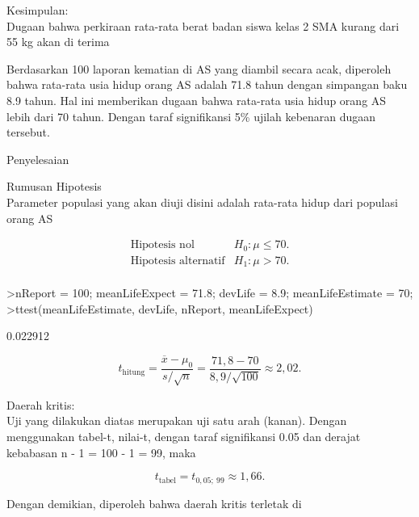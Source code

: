 \documentclass[a4paper,10pt]{article}
\begin{document}
\begin{eulernotebook}
\begin{eulercomment}
\begin{eulercomment}
\begin{eulercomment}
\begin{eulercomment}
\begin{eulercomment}
\begin{eulercomment}
\begin{eulercomment}
Kesimpulan:\\
Dugaan bahwa perkiraan rata-rata berat badan siswa kelas 2 SMA kurang
dari 55 kg akan di terima
\end{eulercomment}
\begin{eulercomment}
Berdasarkan 100 laporan kematian di AS yang diambil secara acak,
diperoleh bahwa rata-rata usia hidup orang AS adalah 71.8 tahun dengan
simpangan baku 8.9 tahun. Hal ini memberikan dugaan bahwa rata-rata
usia hidup orang AS lebih dari 70 tahun. Dengan taraf signifikansi 5\%
ujilah kebenaran dugaan tersebut.

Penyelesaian

Rumusan Hipotesis\\
Parameter populasi yang akan diuji  disini adalah rata-rata hidup dari
populasi orang AS

\end{eulercomment}
\begin{eulerformula}
\[
\begin{array}{cc} \text{Hipotesis nol} & H_0: \mu\le 70. \\ \text{Hipotesis alternatif} & H_1: \mu > 70. \\ \end{array}
\]
\end{eulerformula}
\begin{eulerprompt}
>nReport = 100; meanLifeExpect = 71.8; devLife = 8.9; meanLifeEstimate = 70;
>ttest(meanLifeEstimate, devLife, nReport, meanLifeExpect)
\end{eulerprompt}
\begin{euleroutput}
  0.022912
\end{euleroutput}
\begin{eulerformula}
\[
t_{\text{hitung}} = \dfrac{\overline{x}-\mu_0}{s/\sqrt{n}} = \dfrac{71,\!8-70}{8,\!9/\sqrt{100}} \approx 2,\!02.
\]
\end{eulerformula}
\begin{eulercomment}
Daerah kritis:\\
Uji yang dilakukan diatas merupakan uji satu arah (kanan). Dengan
menggunakan tabel-t, nilai-t, dengan taraf signifikansi 0.05 dan
derajat kebabasan n - 1 = 100 - 1 = 99, maka

\end{eulercomment}
\begin{eulerformula}
\[
t_{\text{tabel}} = t_{0,05; ~99} \approx 1,\!66.
\]
\end{eulerformula}
\begin{eulercomment}
Dengan demikian, diperoleh bahwa daerah kritis terletak  di


\end{eulercomment}
\end{eulercomment}
\end{eulercomment}
\end{eulercomment}
\end{eulercomment}
\end{eulercomment}
\end{eulercomment}
\end{eulernotebook}
\end{document}

